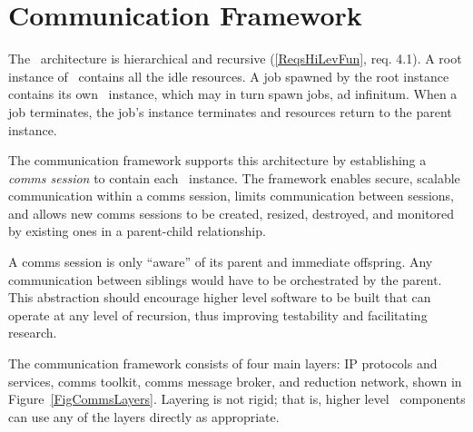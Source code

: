 \section{Communication Framework}\label{SecComms}

The \ngrm\ architecture is hierarchical and recursive
(\ref{ReqsHiLevFun}, req. 4.1).
A root instance of \ngrm\ contains all the
idle resources.  A job spawned by the root instance contains
its own \ngrm\ instance, which may in turn spawn jobs, ad infinitum.
When a job terminates, the job's instance terminates and resources
return to the parent instance.

The communication framework supports this architecture by
establishing a {\em comms session} to contain each \ngrm\ instance.
The framework enables secure, scalable communication
within a comms session, limits communication between sessions,
and allows new comms sessions to be created, resized, destroyed,
and monitored by existing ones in a parent-child relationship.

A comms session is only ``aware'' of its parent and immediate offspring.
Any communication between siblings would have to be orchestrated by
the parent.  This abstraction should encourage higher level software
to be built that can operate at any level of recursion, thus improving
testability and facilitating research.

The communication framework consists of four main layers:
IP protocols and services, comms toolkit, comms message broker, and
reduction network, shown
in Figure~\ref{FigCommsLayers}.  Layering is not rigid;
that is, higher level \ngrm\ components can use any of the
layers directly as appropriate.

